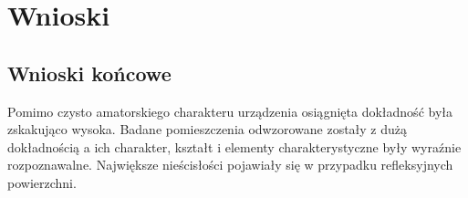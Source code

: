 \section {Wnioski}
\subsection {Wnioski końcowe}
Pomimo czysto amatorskiego charakteru urządzenia osiągnięta dokładność była zskakująco wysoka. Badane pomieszczenia odwzorowane zostały z dużą dokładnością a ich charakter, kształt i elementy charakterystyczne były wyraźnie rozpoznawalne. Największe nieścisłości pojawiały się w przypadku refleksyjnych powierzchni.
